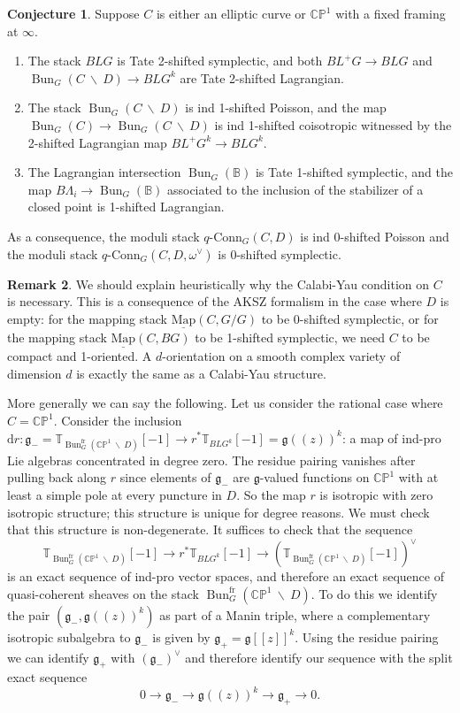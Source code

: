 \documentclass[11pt, oneside, reqno]{amsart}
\theoremstyle{definition} \newtheorem{definition}{Definition}[section]
\newtheorem{conjecture}[definition]{Conjecture}
\theoremstyle{definition} \newtheorem{remark}[definition]{Remark}
\theoremstyle{definition} \newtheorem{remarks}[definition]{Remarks}
\theoremstyle{definition} \newtheorem{question}[definition]{Question}
\theoremstyle{definition} \newtheorem*{note}{Note}
\theoremstyle{definition} \newtheorem{example}[definition]{Example}
\theoremstyle{definition} \newtheorem{examples}[definition]{Examples}
\renewcommand{\gg}{\mathfrak{g}}
\newcommand{\bb}[1]{\mathbb{#1}}
\newcommand{\mr}[1]{\mathrm{#1}}
\newcommand{\bs}{\ \backslash \ }
\newcommand{\ul}[1]{\underline{#1}}
\DeclareMathOperator{\bun}{Bun}
\newcommand{\map}{\ul{\mr{Map}}}
\newcommand{\qconn}{q\text{-Conn}}
\renewcommand{\d}{\mathrm{d}}
\newcommand{\fr}{\mathrm{fr}}
\begin{document}
\begin{conjecture}
Suppose $C$ is either an elliptic curve or $\bb{CP}^1$ with a fixed framing at $\infty$.
\begin{enumerate}
\item The stack $BLG$ is Tate 2-shifted symplectic, and both $BL^+G \to BLG$ and $\bun_G(C \bs D) \to BLG^k$ are Tate 2-shifted Lagrangian.  
\item The stack $\bun_G(C \bs D)$ is ind 1-shifted Poisson, and the map $\bun_G(C) \to \bun_G(C \bs D)$ is ind 1-shifted coisotropic witnessed by the 2-shifted Lagrangian map $BL^+G^k \to BLG^k$.
\item The Lagrangian intersection $\bun_G(\bb B)$ is Tate 1-shifted symplectic, and the map $B\Lambda_i \to \bun_G(\bb B)$ associated to the inclusion of the stabilizer of a closed point is 1-shifted Lagrangian.
\end{enumerate}
As a consequence, the moduli stack $\qconn_G(C,D)$ is ind 0-shifted Poisson and the moduli stack $\qconn_G(C,D, \omega^\vee)$ is 0-shifted symplectic.
\end{conjecture}

\begin{remark}
We should explain heuristically why the Calabi-Yau condition on $C$ is necessary.  This is a consequence of the AKSZ formalism in the case where $D$ is empty: for the mapping stack $\map(C, G/G)$ to be 0-shifted symplectic, or for the mapping stack $\map(C,BG)$ to be 1-shifted symplectic, we need $C$ to be compact and 1-oriented.  A $d$-orientation on a smooth complex variety of dimension $d$ is exactly the same as a Calabi-Yau structure.

More generally we can say the following.  Let us consider the rational case where $C = \bb{CP}^1$.  Consider the inclusion $\d r \colon \gg_- = \bb T_{\bun_G^\fr(\bb{CP}^1 \! \bs \! D)}[-1] \to r^*\bb T_{BLG^k}[-1] = \gg(\!(z)\!)^k$: a map of ind-pro Lie algebras concentrated in degree zero.  The residue pairing vanishes after pulling back along $r$ since elements of $\gg_-$ are  $\gg$-valued functions on $\bb{CP}^1$ with at least a simple pole at every puncture in $D$.  So the map $r$ is isotropic with zero isotropic structure; this structure is unique for degree reasons.  We must check that this structure is non-degenerate.  It suffices to check that the sequence
\[\bb T_{\bun_G^\fr(\bb{CP}^1 \! \bs \! D)}[-1] \to r^*\bb T_{BLG^k}[-1] \to (\bb T_{\bun_G^\fr(\bb{CP}^1 \! \bs \! D)}[-1])^\vee\]
is an exact sequence of ind-pro vector spaces, and therefore an exact sequence of quasi-coherent sheaves on the stack $\bun_G^\fr(\bb{CP}^1 \! \bs \! D)$.  To do this we identify the pair $(\gg_-, \gg(\!(z)\!)^k)$ as part of a Manin triple, where a complementary isotropic subalgebra to $\gg_-$ is given by $\gg_+ = \gg[[z]]^k$.  Using the residue pairing we can identify $\gg_+$ with $(\gg_-)^\vee$ and therefore identify our sequence with the split exact sequence
\[0 \to \gg_- \to \gg(\!(z)\!)^k \to \gg_+ \to 0.\]
\end{remark}
\end{document}
